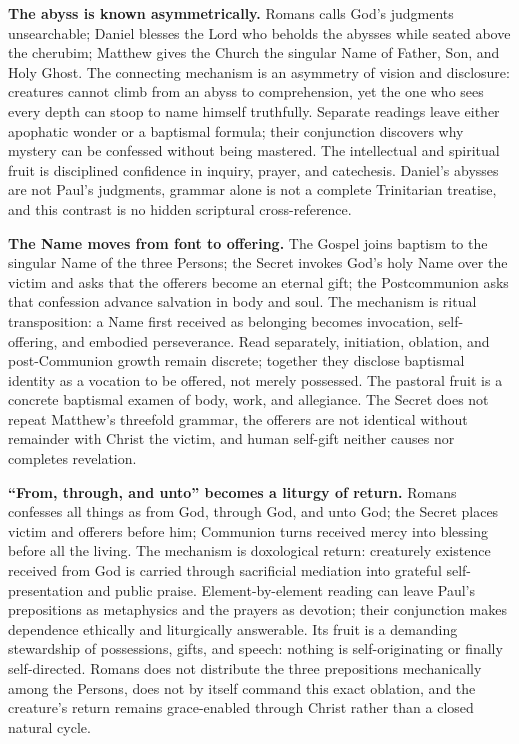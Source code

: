 \begin{deepstudy}
\noindent\textbf{The abyss is known asymmetrically.\enspace{}}
Romans calls God's judgments unsearchable; Daniel blesses the Lord who beholds the abysses while seated above the cherubim; Matthew gives the Church the singular Name of Father, Son, and Holy Ghost. The connecting mechanism is an asymmetry of vision and disclosure: creatures cannot climb from an abyss to comprehension, yet the one who sees every depth can stoop to name himself truthfully. Separate readings leave either apophatic wonder or a baptismal formula; their conjunction discovers why mystery can be confessed without being mastered. The intellectual and spiritual fruit is disciplined confidence in inquiry, prayer, and catechesis. Daniel's abysses are not Paul's judgments, grammar alone is not a complete Trinitarian treatise, and this contrast is no hidden scriptural cross-reference.

\noindent\textbf{The Name moves from font to offering.\enspace{}}
The Gospel joins baptism to the singular Name of the three Persons; the Secret invokes God's holy Name over the victim and asks that the offerers become an eternal gift; the Postcommunion asks that confession advance salvation in body and soul. The mechanism is ritual transposition: a Name first received as belonging becomes invocation, self-offering, and embodied perseverance. Read separately, initiation, oblation, and post-Communion growth remain discrete; together they disclose baptismal identity as a vocation to be offered, not merely possessed. The pastoral fruit is a concrete baptismal examen of body, work, and allegiance. The Secret does not repeat Matthew's threefold grammar, the offerers are not identical without remainder with Christ the victim, and human self-gift neither causes nor completes revelation.

\noindent\textbf{``From, through, and unto'' becomes a liturgy of return.\enspace{}}
Romans confesses all things as from God, through God, and unto God; the Secret places victim and offerers before him; Communion turns received mercy into blessing before all the living. The mechanism is doxological return: creaturely existence received from God is carried through sacrificial mediation into grateful self-presentation and public praise. Element-by-element reading can leave Paul's prepositions as metaphysics and the prayers as devotion; their conjunction makes dependence ethically and liturgically answerable. Its fruit is a demanding stewardship of possessions, gifts, and speech: nothing is self-originating or finally self-directed. Romans does not distribute the three prepositions mechanically among the Persons, does not by itself command this exact oblation, and the creature's return remains grace-enabled through Christ rather than a closed natural cycle.


\end{deepstudy}
